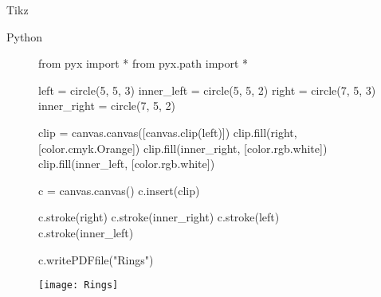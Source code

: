 \documentclass{mwart}
\begin{document}
\def\ringa{(-1,0) circle (2) (-1,0) circle (3)}
\def\ringb{(1,0) circle (2) (1,0) circle (3)}
Tikz
\vspace{1cm}
\newline
{}
\vspace{1cm}
\newline
Python
\vspace{1cm}
\begin{figure}[h]
\begin{python}
from pyx import *
from pyx.path import *

left = circle(5, 5, 3)
inner_left = circle(5, 5, 2)
right = circle(7, 5, 3)
inner_right = circle(7, 5, 2)

clip = canvas.canvas([canvas.clip(left)])
clip.fill(right, [color.cmyk.Orange])
clip.fill(inner_right, [color.rgb.white])
clip.fill(inner_left, [color.rgb.white])

c = canvas.canvas()
c.insert(clip)

c.stroke(right)
c.stroke(inner_right)
c.stroke(left)
c.stroke(inner_left)

c.writePDFfile("Rings")
\end{python}
\texttt{[image: Rings]}
\end{figure}
\end{document}
